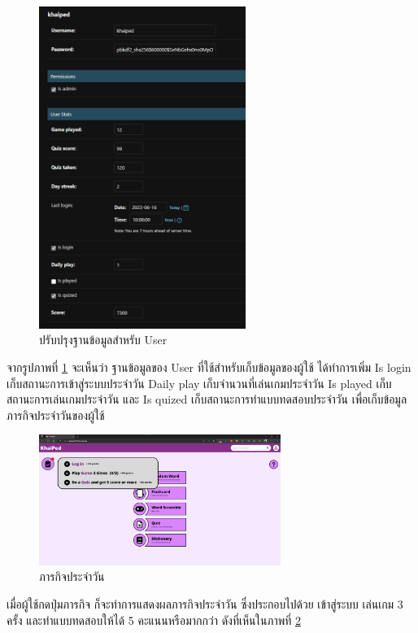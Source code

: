 \documentclass[12pt,oneside,openright,a4paper]{cpe-thai-project}
\begin{document}
\begin{figure}[!h]\centering
	\includegraphics[width=0.6\textwidth, keepaspectratio=true]{image/chap4/DB/user 2.png}
	\caption{{ปรับปรุงฐานข้อมูลสำหรับ User}}\label{fig:chap4User2}
\end{figure}
\hspace{1cm}
จากรูปภาพที่ \ref{fig:chap4User2} จะเห็นว่า ฐานข้อมูลของ User ที่ใช้สำหรับเก็บข้อมูลของผู้ใช้
ได้ทำการเพิ่ม Is login เก็บสถานะการเข้าสู่ระบบประจำวัน Daily play เก็บจํานวนที่เล่นเกมประจำวัน
Is played เก็บสถานะการเล่นเกมประจำวัน และ Is quized เก็บสถานะการทำแบบทดสอบประจำวัน
เพื่อเก็บข้อมูลภารกิจประจำวันของผู้ใช้

\pagebreak
\begin{figure}[!h]\centering
	\includegraphics[width=0.7\textwidth, keepaspectratio=true]{image/chap4/Final/quest.png}
	\caption{{ภารกิจประจำวัน}}\label{fig:chap4FinQuest}
\end{figure}
\hspace{1cm}
เมื่อผู้ใช้กดปุ่มภารกิจ ก็จะทำการแสดงผลภารกิจประจำวัน ซึ่งประกอบไปด้วย
เข้าสู่ระบบ เล่นเกม 3 ครั้ง และทำแบบทดสอบให้ได้ 5 คะแนนหรือมากกว่า
ดังที่เห็นในภาพที่ \ref{fig:chap4FinQuest}
\end{document}
